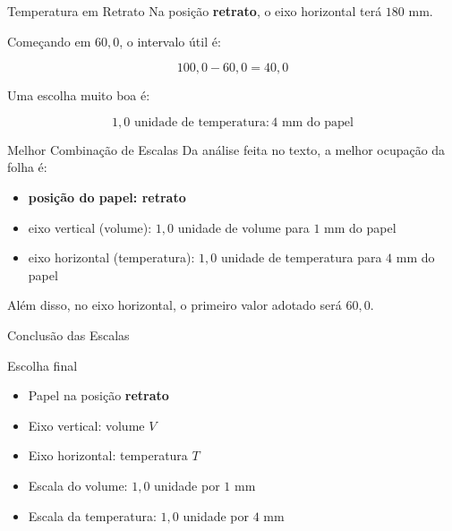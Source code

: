 \documentclass[aspectratio=169]{beamer}
\begin{document}
\begin{frame}{Temperatura em Retrato}
Na posição \textbf{retrato}, o eixo horizontal terá \(180\) mm.

\bigskip

Começando em \(60{,}0\), o intervalo útil é:

\begin{equation}
100{,}0 - 60{,}0 = 40{,}0
\end{equation}

Uma escolha muito boa é:

\begin{equation}
1{,}0 \text{ unidade de temperatura} : 4 \text{ mm do papel}
\end{equation}
\end{frame}

\begin{frame}{Melhor Combinação de Escalas}
Da análise feita no texto, a melhor ocupação da folha é:

\begin{itemize}
\item \textbf{posição do papel: retrato}
\item eixo vertical (volume): \(1{,}0\) unidade de volume para \(1\) mm do papel
\item eixo horizontal (temperatura): \(1{,}0\) unidade de temperatura para \(4\) mm do papel
\end{itemize}

Além disso, no eixo horizontal, o primeiro valor adotado será \(60{,}0\).
\end{frame}

\begin{frame}{Conclusão das Escalas}
\begin{block}{Escolha final}
\begin{itemize}
\item Papel na posição \textbf{retrato}
\item Eixo vertical: volume \(V\)
\item Eixo horizontal: temperatura \(T\)
\item Escala do volume: \(1{,}0\) unidade por \(1\) mm
\item Escala da temperatura: \(1{,}0\) unidade por \(4\) mm
\end{itemize}
\end{block}
\end{frame}
\end{document}
